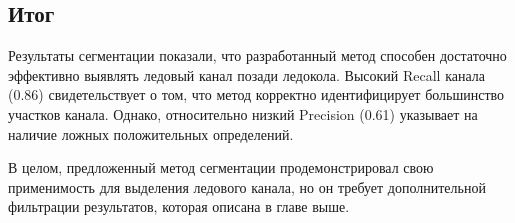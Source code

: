 \subsection{Итог}

Результаты сегментации показали, что разработанный метод способен достаточно эффективно выявлять ледовый канал позади ледокола. 
Высокий Recall канала (0.86) свидетельствует о том, что метод корректно идентифицирует большинство участков канала. 
Однако, относительно низкий Precision (0.61) указывает на наличие ложных положительных определений.

В целом, предложенный метод сегментации продемонстрировал свою применимость для выделения ледового канала, но он требует дополнительной фильтрации результатов, 
которая описана в главе выше.
